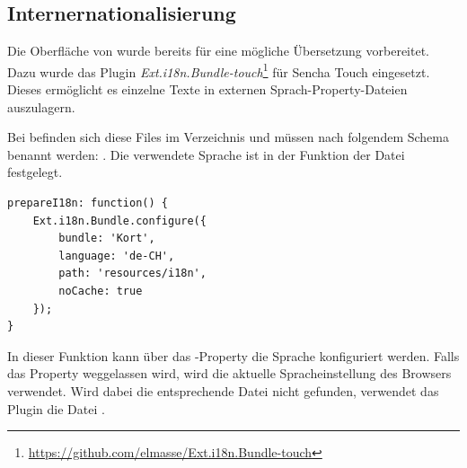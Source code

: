 \subsection{Internernationalisierung}
\label{i18n}
Die Oberfläche von \kort wurde bereits für eine mögliche Übersetzung vorbereitet.
Dazu wurde das Plugin \emph{Ext.i18n.Bundle-touch}\footnote{\url{https://github.com/elmasse/Ext.i18n.Bundle-touch}} für Sencha Touch eingesetzt.
Dieses ermöglicht es einzelne Texte in externen Sprach-Property-Dateien auszulagern.

Bei \kort befinden sich diese Files im Verzeichnis  und müssen nach folgendem Schema benannt werden: .
Die verwendete Sprache ist in der Funktion  der Datei  festgelegt.

\lstset{language=JavaScript}
\begin{lstlisting}[caption=kort - Sprache definieren, label=kort-choose-language]
prepareI18n: function() {
	Ext.i18n.Bundle.configure({
		bundle: 'Kort',
		language: 'de-CH',
		path: 'resources/i18n',
		noCache: true
	});
}
\end{lstlisting}

In dieser Funktion kann über das -Property die Sprache konfiguriert werden.
Falls das Property weggelassen wird, wird die aktuelle Spracheinstellung des Browsers verwendet.
Wird dabei die entsprechende Datei nicht gefunden, verwendet das Plugin die Datei .